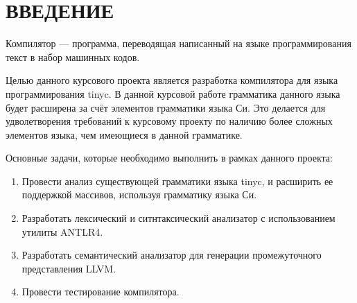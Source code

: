 \section*{ВВЕДЕНИЕ}

Компилятор — программа, переводящая написанный на языке программирования текст в набор машинных кодов\cite{shit:wiki}.

Целью данного курсового проекта является разработка компилятора для языка программирования tinyc. В данной курсовой работе грамматика данного языка будет расширена за счёт элементов грамматики языка Си. Это делается для удволетворения требований к курсовому проекту по наличию более сложных элементов языка, чем имеющиеся в данной грамматике.

Основные задачи, которые необходимо выполнить в рамках данного проекта:
\begin{enumerate}
\item Провести анализ существующей грамматики языка tinyc, и расширить ее поддержкой массивов, используя грамматику языка Си.
\item Разработать лексический и ситнтаксический анализатор с использованием утилиты ANTLR4.
\item Разработать семантический анализатор для генерации промежуточного представления LLVM.
\item Провести тестирование компилятора.
\end{enumerate}
\pagebreak
